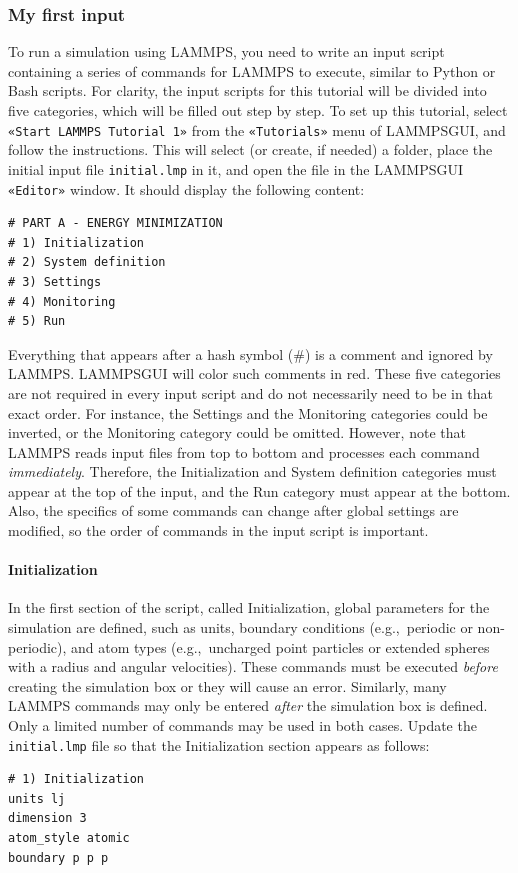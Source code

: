 \documentclass[9pt,tutorial]{livecoms}
\newcommand{\lmpcmd}[1]{\hspace{0pt}\colorbox{listing}{\textcolor{command}{\small{#1}}}\hspace{0pt}} %
\newcommand{\flecmd}[1]{\textcolor{command}{\texttt{#1}}} %
\newcommand{\guicmd}[1]{\textcolor{command}{\texttt{«#1»}}} %
\newcommand{\lammpsgui}{\textsf{LAMMPS\textendash GUI}}
\begin{document}
\subsubsection{My first input}

To run a simulation using LAMMPS, you need to write an input script
containing a series of commands for LAMMPS to execute, similar to Python
or Bash scripts.  For clarity, the input scripts for this tutorial will
be divided into five categories, which will be filled out step by step.
To set up this tutorial, select \guicmd{Start LAMMPS Tutorial 1} from
the \guicmd{Tutorials} menu of \lammpsgui{}, and follow the
instructions.  This will select (or create, if needed) a folder, place
the initial input file \flecmd{initial.lmp} in it, and open the file in
the \lammpsgui{} \guicmd{Editor} window.  It should display the following
content:
\begin{lstlisting}
# PART A - ENERGY MINIMIZATION
# 1) Initialization
# 2) System definition
# 3) Settings
# 4) Monitoring
# 5) Run
\end{lstlisting}
Everything that appears after a hash symbol ($\#$) is a comment
and ignored by LAMMPS.  \lammpsgui{} will color such comments in red.
These five categories are not required in every input script and do not
necessarily need to be in that exact order.  For instance, the \lmpcmd{Settings}
and the \lmpcmd{Monitoring} categories could be inverted, or
the \lmpcmd{Monitoring} category could be omitted.  However, note that
LAMMPS reads input files from top to bottom and processes each command
\emph{immediately}.  Therefore, the \lmpcmd{Initialization} and
\lmpcmd{System definition} categories must appear at the top of the
input, and the \lmpcmd{Run} category must appear at the bottom.  Also, the
specifics of some commands can change after global settings are modified, so the
order of commands in the input script is important.

\paragraph{Initialization}

In the first section of the script, called \lmpcmd{Initialization},
global parameters for the simulation are defined, such as units, boundary conditions
(e.g.,~periodic or non-periodic), and atom types (e.g.,~uncharged point particles
or extended spheres with a radius and angular velocities).  These commands must be
executed \emph{before} creating the simulation box or they will cause
an error.  Similarly, many LAMMPS commands may only be
entered \emph{after} the simulation box is defined.  Only a limited
number of commands may be used in both cases.  Update the \flecmd{initial.lmp} file
so that the \lmpcmd{Initialization} section appears as follows:
\begin{lstlisting}
# 1) Initialization
units lj
dimension 3
atom_style atomic
boundary p p p
\end{lstlisting}
\end{document}
